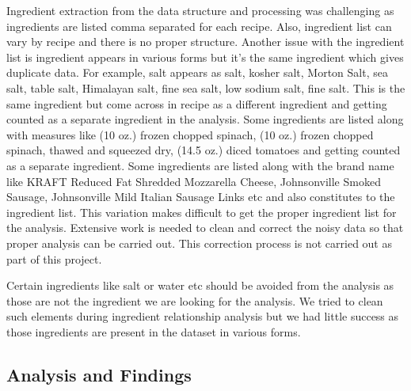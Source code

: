 \documentclass[sigconf]{acmart}
\begin{document}
Ingredient extraction from the data structure and processing was challenging as ingredients are listed comma separated for each recipe. Also, ingredient list can vary by recipe and there is no proper structure. Another issue with the ingredient list is ingredient appears in various forms but it's the same ingredient which gives duplicate data. For example, salt appears as salt, kosher salt, Morton Salt, sea salt, table salt, Himalayan salt, fine sea salt, low sodium salt, fine salt. This is the same ingredient but come across in recipe as a different ingredient and getting counted as a separate ingredient in the analysis. Some ingredients are listed along with measures like (10 oz.) frozen chopped spinach, (10 oz.) frozen chopped spinach, thawed and squeezed dry, (14.5 oz.) diced tomatoes and getting counted as a separate ingredient. Some ingredients are listed along with the brand name like KRAFT Reduced Fat Shredded Mozzarella Cheese, Johnsonville Smoked Sausage, Johnsonville Mild Italian Sausage Links etc and also constitutes to the ingredient list. This variation makes difficult to get the proper ingredient list for the analysis. Extensive work is needed to clean and correct the noisy data so that proper analysis can be carried out. This correction process is not carried out as part of this project.

Certain ingredients like salt or water etc should be avoided from the analysis as those are not the ingredient we are looking for the analysis. We tried to clean such elements during ingredient relationship analysis but we had little success as those ingredients are present in the dataset in various forms.  

\subsection{Analysis and Findings}
\end{document}
